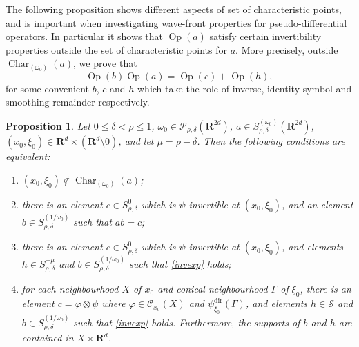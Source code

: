 \documentclass[12pt,a4paper,reqno]{amsart}
\numberwithin{equation}{section}
\numberwithin{thm}{section}
\newtheorem{prop}[thm]{Proposition}
\theoremstyle{definition}
\theoremstyle{remark}
\begin{document}
\par

The following proposition shows different aspects of set of
characteristic points, and is important when investigating wave-front
properties for pseudo-differential operators. In particular it shows
that ${\operatorname{Op}} (a)$ satisfy certain invertibility properties outside the
set of characteristic points for $a$. More precisely,  
outside ${\operatorname{Char}} _{(\omega _0)}(a)$, we prove that
\begin{equation}\label{invexp}
{\operatorname{Op}} (b){\operatorname{Op}} (a) ={\operatorname{Op}} (c)+{\operatorname{Op}} (h),
\end{equation}
for some convenient $b$, $c$ and $h$ which take the role of inverse,
identity symbol and smoothing remainder respectively.

\par

\begin{prop}\label{psiecharequiv}
Let  $0\le \delta <\rho \le 1$, $\omega _0\in \mathscr
P_{\rho,\delta}({\mathbf R^{{2d}}})$, $a\in S^{(\omega _0)}_{\rho,\delta}({\mathbf R^{{2d}}})$, $(x_0,\xi _0)\in {\mathbf R^{d}} \times ({\mathbf R^{d}}{\setminus 0})$, and let
$\mu =\rho -\delta$. Then the following conditions are equivalent:
\begin{enumerate}
\item $(x_0,\xi _0)\notin {\operatorname{Char}} _{(\omega _0)} (a)$;

{\vspace{0.1cm}}

\item there is an element $c\in S^0_{\rho ,\delta}$ which is $\psi$-invertible at $(x_0,\xi _0)$, and an element $b\in S^{(1/\omega _0)}_{\rho,\delta}$ such that $ab=c$;

{\vspace{0.1cm}}
 
\item there is an element $c\in S^0_{\rho ,\delta}$ which is $\psi$-invertible at $(x_0,\xi _0)$, and elements 
$h\in S^{-\mu}_{\rho,\delta}$ and $b\in S^{(1/\omega _0)}_{\rho,\delta}$ such that \eqref{invexp} holds;

{\vspace{0.1cm}}

\item for each neighbourhood $X$ of $x_0$ and conical neighbourhood $\Gamma $ of $\xi _0$, there is an element $c={\varphi} \otimes \psi$ where ${\varphi} \in \mathscr C_{x_0}(X)$ and $\psi _{\xi _0}^{{\operatorname{dir}}} (\Gamma )$, and elements 
$h\in \mathscr S$ and $b\in S^{(1/\omega _0)}_{\rho,\delta}$ such that \eqref{invexp} holds. Furthermore, 
the supports of $b$ and $h$ are contained in $X\times {\mathbf R^{d}}$.
\end{enumerate}
\end{prop}
\end{document}
